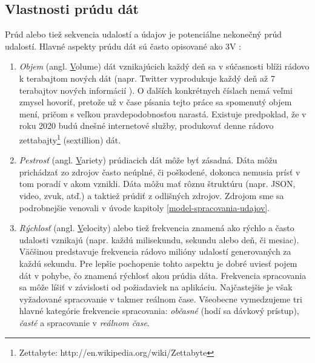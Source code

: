 \subsection{Vlastnosti prúdu dát}
Prúd alebo tiež sekvencia udalostí a údajov je potenciálne nekonečný prúd udalostí. Hlavné aspekty prúdu dát sú často opisované ako 3V \citep{zikopoulos2011understanding, zaslavsky2013sensing}:
\begin{enumerate}
	\item \textit{Objem} (angl. \underline{V}olume) dát vznikajúcich každý deň sa v súčasnosti blíži rádovo k terabajtom nových dát (napr. Twitter vyprodukuje každý deň až 7 terabajtov nových informácií \citep{mathioudakis2010twittermonitor}). O ďalších konkrétnych číslach nemá veľmi zmysel hovoriť, pretože už v čase písania tejto práce sa spomenutý objem mení, pričom s veľkou pravdepodobnosťou narastá. Existuje predpoklad, že v roku 2020 budú dnešné internetové služby, produkovať denne rádovo zettabajty\footnote{Zettabyte: http://en.wikipedia.org/wiki/Zettabyte} (sextillion) dát.
	\item \textit{Pestrosť} (angl. \underline{V}ariety) prúdiacich dát môže byť zásadná. Dáta môžu prichádzať zo zdrojov často neúplné, či poškodené, dokonca nemusia prísť v tom poradí v akom vznikli. Dáta môžu mať rôznu štruktúru (napr. JSON, video, zvuk, atď.) a taktiež prúdiť z odlišných zdrojov. Zdrojom sme sa podrobnejšie venovali v úvode kapitoly \ref{model-spracovania-udajov}.
	\item \textit{Rýchlosť} (angl. \underline{V}elocity) alebo tiež frekvencia znamená ako rýchlo a často udalosti vznikajú (napr. každú milisekundu, sekundu alebo deň, či mesiac). Väčšinou predstavuje frekvencia rádovo milióny udalostí generovaných za každú sekundu. Pre lepšie pochopenie tohto aspektu je dobré uviesť pojem dát v pohybe, čo znamená rýchlosť akou prúdia dáta. Frekvencia spracovania sa môže líšiť v závislosti od požiadaviek na aplikáciu. Najčastejšie je však vyžadované spracovanie v takmer reálnom čase. Všeobecne vymedzujeme tri hlavné kategórie frekvencie spracovania: \textit{občasné} (hodí sa dávkový prístup), \textit{časté} a spracovanie v \textit{reálnom čase}.
\end{enumerate}


